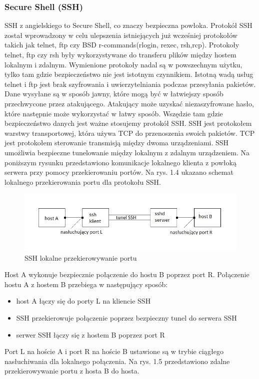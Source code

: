 \documentclass[12p]{article}
\begin{document}
\subsubsection{Secure Shell (SSH)}
\quad SSH z angielskiego to Secure Shell, co znaczy bezpieczna powłoka. Protokół SSH został wprowadzony w celu ulepszenia istniejących już wcześniej protokołów takich jak telnet, ftp czy BSD r-commands(rlogin, rexec, rsh,rcp). Protokoły telnet, ftp czy rsh były wykorzystywane do transferu plików między hostem lokalnym i zdalnym. Wymienione protokoły nadal są w powszechnym użytku, tylko tam gdzie bezpieczeństwo nie jest istotnym czynnikiem. Istotną wadą usług telnet i ftp jest brak szyfrowania i uwierzytelniania podczas przesyłania pakietów. Dane wysyłane są w sposób jawny, które mogą być w łatwiejszy sposób przechwycone przez atakującego. Atakujący może uzyskać niezaszyfrowane hasło, które następnie może wykorzystać w łatwy sposób. Wszędzie tam gdzie bezpieczeństwo danych jest ważne stosujemy protokół SSH. 
\quad SSH jest protokołem warstwy transportowej, która używa TCP do przenoszenia swoich pakietów. TCP jest protokołem sterowanie transmisją między dwoma urządzeniami. SSH umożliwia bezpieczne tunelowanie między lokalnym z zdalnym urządzeniem. Na poniższym rysunku przedstawiono komunikacje lokalnego klienta z powłoką serwera przy pomocy przekierowaniu portów. Na rys. 1.4 ukazano schemat lokalnego przekierowania portu dla protokołu SSH.
\begin{figure}[h]
\centering
\includegraphics[width=12cm]{przekierowywanie_lokalne_SSH.jpg}
\caption{SSH lokalne przekierowywanie portu}
\end{figure}

Host A wykonuje bezpiecznie połączenie do hostu B poprzez port R. Połączenie hostu A z hostem B przebiega w następujący sposób:
\begin{itemize}
\item host A łączy się do porty L na kliencie SSH
\item SSH przekierowuje połączenie poprzez bezpieczny tunel do serwera SSH
\item serwer SSH łączy się z hostem B poprzez port R
\end{itemize}
\newpage Port L na hoście A i port R na hoście B ustawione są w trybie ciągłego nasłuchiwania dla lokalnego połączenia. Na rys. 1.5 przedstawiono zdalne przekierowywanie portu z hosta B do hosta.
 
\end{document}
